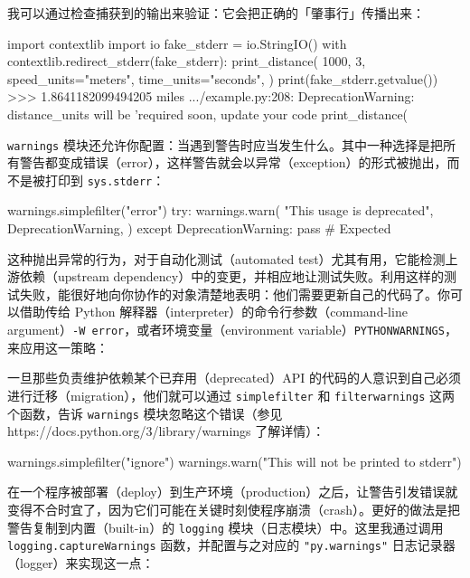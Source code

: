 我可以通过检查捕获到的输出来验证：它会把正确的「肇事行」传播出来：

\begin{codebox}[python]
import contextlib
import io
fake_stderr = io.StringIO()
with contextlib.redirect_stderr(fake_stderr):
    print_distance(
        1000,
        3,
        speed_units="meters",
        time_units="seconds",
    )
print(fake_stderr.getvalue())
>>>
1.8641182099494205 miles
.../example.py:208: DeprecationWarning: distance_units will be
'required soon, update your code
  print_distance(
\end{codebox}

\texttt{warnings} 模块还允许你配置：当遇到警告时应当发生什么。其中一种选择是把所有警告都变成错误（error），这样警告就会以异常（exception）的形式被抛出，而不是被打印到 \texttt{sys.stderr}：

\begin{codebox}[python]
warnings.simplefilter("error")
try:
    warnings.warn(
        "This usage is deprecated",
        DeprecationWarning,
    )
except DeprecationWarning:
    pass  # Expected
\end{codebox}

这种抛出异常的行为，对于自动化测试（automated test）尤其有用，它能检测上游依赖（upstream dependency）中的变更，并相应地让测试失败。利用这样的测试失败，能很好地向你协作的对象清楚地表明：他们需要更新自己的代码了。你可以借助传给 Python 解释器（interpreter）的命令行参数（command-line argument）\texttt{-W error}，或者环境变量（environment variable）\texttt{PYTHONWARNINGS}，来应用这一策略：


一旦那些负责维护依赖某个已弃用（deprecated）API 的代码的人意识到自己必须进行迁移（migration），他们就可以通过 \texttt{simplefilter} 和 \texttt{filterwarnings} 这两个函数，告诉 \texttt{warnings} 模块忽略这个错误（参见 https://docs.python.org/3/library/warnings 了解详情）：

\begin{codebox}[python]
warnings.simplefilter("ignore")
warnings.warn("This will not be printed to stderr")
\end{codebox}

在一个程序被部署（deploy）到生产环境（production）之后，让警告引发错误就变得不合时宜了，因为它们可能在关键时刻使程序崩溃（crash）。更好的做法是把警告复制到内置（built-in）的 \texttt{logging} 模块（日志模块）中。这里我通过调用 \texttt{logging.captureWarnings} 函数，并配置与之对应的 \texttt{"py.warnings"} 日志记录器（logger）来实现这一点：

